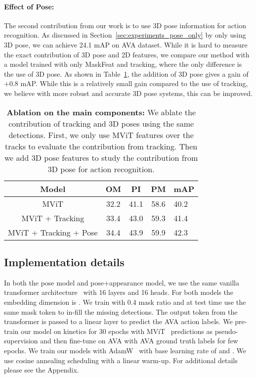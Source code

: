 \paragraph{Effect of Pose:} The second contribution from our work is to use 3D pose information for action recognition. As discussed in Section~\ref{sec:experiments_pose_only} by only using 3D pose, we can achieve 24.1 mAP on AVA dataset. While it is hard to measure the exact contribution of 3D pose and 2D features, we compare our method with a model trained with only MaskFeat and tracking, where the only difference is the use of 3D pose. As shown in Table~\ref{tbl:main_ablation}, the addition of 3D pose gives a gain of +0.8 mAP. While this is a relatively small gain compared to the use of tracking, we believe with more robust and accurate 3D pose systems, this can be improved. 


\begin{table}[!h]
\begin{center}
\small
\vspace{5pt}
\begin{tabular}{c c c c l}
\toprule[0.4mm]
Model & OM & PI & PM & mAP \\ \midrule
MViT                   & 32.2 & 41.1 & 58.6 & 40.2 \\
MViT + Tracking        & 33.4 & 43.0 & 59.3 & 41.4 \\
MViT + Tracking + Pose & 34.4 & 43.9 & 59.9 & 42.3 \\
\bottomrule[0.4mm]
\end{tabular}
\end{center}
\vspace{-10pt}
\caption{\textbf{Ablation on the main components:} We ablate the contribution of tracking and 3D poses using the same detections. First, we only use MViT features over the tracks to evaluate the contribution from tracking. Then we add 3D pose features to study the contribution from 3D pose for action recognition.} 
\vspace{-0.4cm}
\label{tbl:main_ablation}
\end{table}




\subsection{Implementation details}
In both the pose model and pose+appearance model, we use the same vanilla transformer architecture~\cite{vaswani2017attention} with 16 layers and 16 heads. For both models the embedding dimension is . We train with 0.4 mask ratio and at test time use the same mask token to in-fill the missing detections. The output token from the transformer is passed to a linear layer to predict the AVA action labels. We pre-train our model on kinetics for 30 epochs with MViT~\cite{fan2021multiscale} predictions as pseudo-supervision and then fine-tune on AVA with AVA ground truth labels for few epochs. We train our models with AdamW~\cite{loshchilov2017decoupled} with base learning rate of  and . We use cosine annealing scheduling with a linear warm-up. For additional details please see the Appendix.



